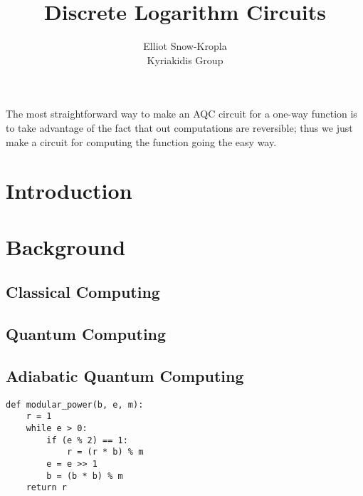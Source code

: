 \documentclass{article}
\title{Discrete Logarithm Circuits}
\author{Elliot Snow-Kropla\\Kyriakidis Group}
\begin{document}
\maketitle
The most straightforward way to make an AQC circuit for a one-way function is to take advantage of the fact that out computations are reversible; thus we just make a circuit for computing the function going the easy way.

\section{Introduction}

\section{Background}

\subsection{Classical Computing}

\subsection{Quantum Computing}

\subsection{Adiabatic Quantum Computing}

\begin{lstlisting}
def modular_power(b, e, m):
	r = 1
	while e > 0:
		if (e % 2) == 1:
			r = (r * b) % m
		e = e >> 1
		b = (b * b) % m
	return r
\end{lstlisting}



{}

\end{document}
